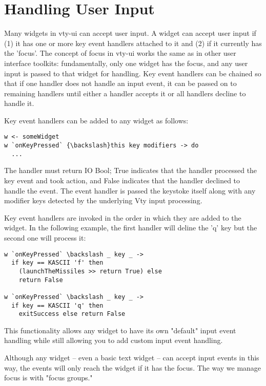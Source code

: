 \section{Handling User Input}

Many widgets in vty-ui can accept user input.  A widget can accept user
input if (1) it has one or more key event handlers attached to it and
(2) if it currently has the 'focus'.  The concept of focus in vty-ui
works the same as in other user interface toolkits:  fundamentally, only
one widget has the focus, and any user input is passed to that widget
for handling.  Key event handlers can be chained so that if one handler
does not handle an input event, it can be passed on to remaining
handlers until either a handler accepts it or all handlers decline to
handle it.

Key event handlers can be added to any widget as follows:

\begin{verbatim}
w <- someWidget
w `onKeyPressed` {\backslash}this key modifiers -> do
  ...
\end{verbatim}

The handler must return IO Bool; True indicates that the handler
processed the key event and took action, and False indicates that the
handler declined to handle the event.  The event handler is passed the
keystoke itself along with any modifier keys detected by the underlying
Vty input processing.

Key event handlers are invoked in the order in which they are added to
the widget.  In the following example, the first handler will deline the
'q' key but the second one will process it:

\begin{verbatim}
w `onKeyPressed` \backslash _ key _ ->
  if key == KASCII 'f' then
    (launchTheMissiles >> return True) else
    return False

w `onKeyPressed` \backslash _ key _ ->
  if key == KASCII 'q' then
    exitSuccess else return False
\end{verbatim}

This functionality allows any widget to have its own "default" input
event handling while still allowing you to add custom input event
handling.

Although any widget -- even a basic text widget -- can accept input
events in this way, the events will only reach the widget if it has the
focus.  The way we manage focus is with "focus groups."
